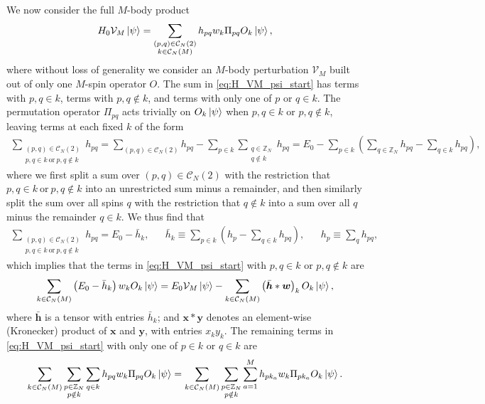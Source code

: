 \documentclass[nofootinbib,notitlepage,11pt]{revtex4-2}
\renewcommand{\t}{\text} %
\newcommand{\p}[1]{\left(#1\right)} %
\newcommand{\m}{\bm} %
\newcommand{\1}{\mathds{1}}
\newcommand{\C}{\mathcal{C}}
\newcommand{\V}{\mathcal{V}}
\newcommand{\ZZ}{\mathbb{Z}}
\begin{document}
We now consider the full $M$-body product
\begin{align}
  H_0 \V_M \ket\psi
  = \sum_{\substack{\p{p,q}\in\C_N\p{2}\\k\in\C_N\p{M}}} h_{pq} w_k
  \Pi_{pq} O_k \ket\psi,
  \label{eq:H_VM_psi_start}
\end{align}
where without loss of generality we consider an $M$-body perturbation
$\V_M$ built out of only one $M$-spin operator $O$.  The sum in
\eqref{eq:H_VM_psi_start} has terms with $p,q\in k$, terms with
$p,q\notin k$, and terms with only one of $p$ or $q\in k$.  The
permutation operator $\Pi_{pq}$ acts trivially on $O_k\ket\psi$ when
$p,q\in k$ or $p,q\notin k$, leaving terms at each fixed $k$ of the
form
\begin{align}
  \sum_{\substack{\p{p,q}\in\C_N\p{2}\\p,q\in k~\t{or}~p,q\notin k}} h_{pq}
  = \sum_{\p{p,q}\in\C_N\p{2}} h_{pq}
  - \sum_{p\in k} \sum_{\substack{q\in\ZZ_N\\q\notin k}} h_{pq}
  = E_0 - \sum_{p\in k}
  \p{\sum_{q\in\ZZ_N} h_{pq} - \sum_{q\in k} h_{pq}},
\end{align}
where we first split a sum over $\p{p,q}\in\C_N\p{2}$ with the
restriction that $p,q\in k~\t{or}~p,q\notin k$ into an unrestricted
sum minus a remainder, and then similarly split the sum over all spins
$q$ with the restriction that $q\notin k$ into a sum over all $q$
minus the remainder $q\in k$.  We thus find that
\begin{align}
  \sum_{\substack{\p{p,q}\in\C_N\p{2}\\p,q\in k~\t{or}~p,q\notin k}} h_{pq}
  = E_0 - \bar h_k,
  &&
  \bar h_k \equiv \sum_{p\in k}\p{h_p - \sum_{q\in k}h_{pq}},
  &&
  h_p \equiv \sum_q h_{pq},
\end{align}
which implies that the terms in \eqref{eq:H_VM_psi_start} with
$p,q\in k$ or $p,q\notin k$ are
\begin{align}
  \sum_{k\in\C_N\p{M}} \p{E_0 - \bar h_k} w_k O_k \ket\psi
  = E_0 \V_M \ket\psi
  - \sum_{k\in\C_N\p{M}} \p{\bar{\m h} * \m w}_k O_k \ket\psi,
\end{align}
where $\bar{\m h}$ is a tensor with entries $\bar h_k$; and
$\m x*\m y$ denotes an element-wise (Kronecker) product of $\m x$ and
$\m y$, with entries $x_ky_k$.  The remaining terms in
\eqref{eq:H_VM_psi_start} with only one of $p\in k$ or $q\in k$ are
\begin{align}
  \sum_{k\in\C_N\p{M}} \sum_{\substack{p\in\ZZ_N\\p\notin k}} \sum_{q\in k}
  h_{pq} w_k \Pi_{pq} O_k \ket\psi
  = \sum_{k\in\C_N\p{M}} \sum_{\substack{p\in\ZZ_N\\p\notin k}}
  \sum_{a=1}^M h_{p k_a} w_k \Pi_{p k_a} O_k \ket\psi.
\end{align}
\end{document}

